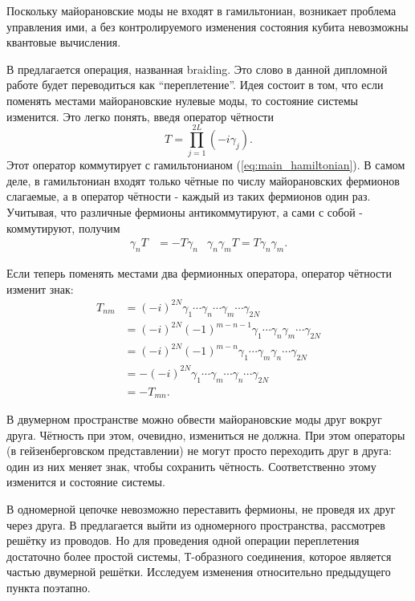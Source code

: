 \documentclass[a4paper,12pt]{article}
\theoremstyle{plain} %
\theoremstyle{definition} %
\theoremstyle{remark} %
\begin{document}
Поскольку майорановские моды не входят в гамильтониан, возникает проблема управления ими, а без контролируемого изменения состояния кубита невозможны квантовые вычисления.

В \cite{braiding} предлагается операция, названная braiding. Это слово в данной дипломной работе будет переводиться как ``переплетение''. Идея состоит в том, что если поменять местами майорановские нулевые моды, то состояние системы изменится. Это легко понять, введя оператор чётности
\begin{equation}
T = \prod\limits_{j=1}^{2L} (-i \gamma_j).
\end{equation}
Этот оператор коммутирует с гамильтонианом (\ref{eq:main_hamiltonian}). В самом деле, в гамильтониан входят только чётные по числу майорановских фермионов слагаемые, а в оператор чётности - каждый из таких фермионов один раз. Учитывая, что различные фермионы антикоммутируют, а сами с собой - коммутируют, получим
\begin{align}
\gamma_n T &= - T \gamma_n & \gamma_n \gamma_m T = T \gamma_n \gamma_m.
\end{align}

Если теперь поменять местами два фермионных оператора, оператор чётности изменит знак:
\begin{equation}
\begin{split}
T_{nm} &= (-i)^{2N} \gamma_1 \dotsm \gamma_n \dotsm \gamma_m \dotsm \gamma_{2N} \\
    &= (-i)^{2N} (-1)^{m-n-1} \gamma_1 \dotsm \gamma_n \gamma_m \dotsm \gamma_{2N} \\ &= (-i)^{2N} (-1)^{m-n} \gamma_1 \dotsm \gamma_m \gamma_n \dotsm \gamma_{2N} \\
    &= - (-i)^{2N} \gamma_1 \dotsm \gamma_m \dotsm \gamma_n \dotsm \gamma_{2N} \\
    &= - T_{mn}.
\end{split}
\end{equation}

В двумерном пространстве можно обвести майорановские моды друг вокруг друга. Чётность при этом, очевидно, измениться не должна. При этом операторы (в гейзенберговском представлении) не могут просто переходить друг в друга: один из них меняет знак, чтобы сохранить чётность. Соответственно этому изменится и состояние системы.

В одномерной цепочке невозможно переставить фермионы, не проведя их друг через друга. В \cite{braiding} предлагается выйти из одномерного пространства, рассмотрев решётку из проводов. Но для проведения одной операции переплетения достаточно более простой системы, Т-образного соединения, которое является частью двумерной решётки. Исследуем изменения относительно предыдущего пункта поэтапно.
\end{document}
